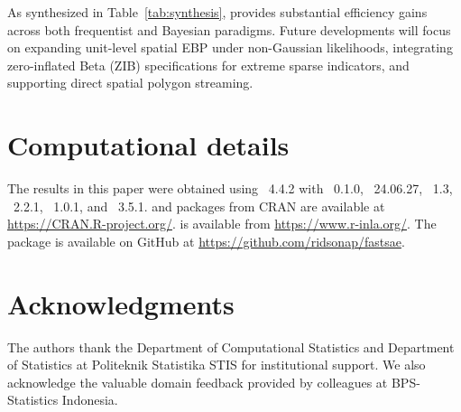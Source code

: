 \documentclass[article]{jss}
\begin{document}
As synthesized in Table~\ref{tab:synthesis},  provides substantial efficiency gains across both frequentist and Bayesian paradigms. Future developments will focus on expanding unit-level spatial EBP under non-Gaussian likelihoods, integrating zero-inflated Beta (ZIB) specifications for extreme sparse indicators, and supporting direct spatial polygon streaming.


\section*{Computational details}

The results in this paper were obtained using ~4.4.2 with ~0.1.0, ~24.06.27, ~1.3, ~2.2.1, ~1.0.1, and ~3.5.1.  and packages from CRAN are available at \url{https://CRAN.R-project.org/}.  is available from \url{https://www.r-inla.org/}. The  package is available on GitHub at \url{https://github.com/ridsonap/fastsae}.

\section*{Acknowledgments}

The authors thank the Department of Computational Statistics and Department of Statistics at Politeknik Statistika STIS for institutional support. We also acknowledge the valuable domain feedback provided by colleagues at BPS-Statistics Indonesia.



\end{document}
